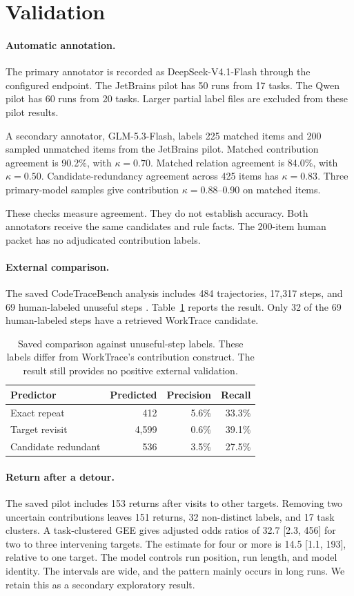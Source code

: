 \documentclass[10pt,a4paper,twocolumn]{article}
\begin{document}
\appendix
\section{Validation}\label{app:validation}
\paragraph{Automatic annotation.}
The primary annotator is recorded as DeepSeek-V4.1-Flash through the configured endpoint. The JetBrains pilot has 50 runs from 17 tasks. The Qwen pilot has 60 runs from 20 tasks. Larger partial label files are excluded from these pilot results.

A secondary annotator, GLM-5.3-Flash, labels 225 matched items and 200 sampled unmatched items from the JetBrains pilot. Matched contribution agreement is 90.2\%, with $\kappa=0.70$. Matched relation agreement is 84.0\%, with $\kappa=0.50$. Candidate-redundancy agreement across 425 items has $\kappa=0.83$. Three primary-model samples give contribution $\kappa=0.88$--0.90 on matched items.

These checks measure agreement. They do not establish accuracy. Both annotators receive the same candidates and rule facts. The 200-item human packet has no adjudicated contribution labels.
\paragraph{External comparison.}
The saved CodeTraceBench analysis includes 484 trajectories, 17,317 steps, and 69 human-labeled unuseful steps \citep{codetracebench}. Table~\ref{tab:ctb} reports the result. Only 32 of the 69 human-labeled steps have a retrieved WorkTrace candidate.
\begin{table}[htbp]
\centering\small
\begin{tabular}{lrrr}
\toprule
Predictor & Predicted & Precision & Recall\\
\midrule
Exact repeat & 412 & 5.6\% & 33.3\%\\
Target revisit & 4,599 & 0.6\% & 39.1\%\\
Candidate redundant & 536 & 3.5\% & 27.5\%\\
\bottomrule
\end{tabular}
\caption{Saved comparison against unuseful-step labels. These labels differ from WorkTrace's contribution construct. The result still provides no positive external validation.}
\label{tab:ctb}
\end{table}
\paragraph{Return after a detour.}
The saved pilot includes 153 returns after visits to other targets. Removing two uncertain contributions leaves 151 returns, 32 non-distinct labels, and 17 task clusters. A task-clustered GEE gives adjusted odds ratios of 32.7 [2.3, 456] for two to three intervening targets. The estimate for four or more is 14.5 [1.1, 193], relative to one target. The model controls run position, run length, and model identity. The intervals are wide, and the pattern mainly occurs in long runs. We retain this as a secondary exploratory result.
\end{document}
